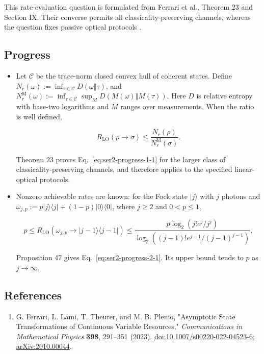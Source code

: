 This rate-evaluation question is formulated from Ferrari et al., Theorem 23 and Section IX. Their converse permits all classicality-preserving channels, whereas the question fixes passive optical protocols .

\subsection*{Progress}

\begin{itemize}
  \item Let $\mathcal C$ be the trace-norm closed convex hull of coherent states. Define $N_r(\omega):=\inf_{\tau\in\mathcal C}D(\omega\Vert\tau)$, and $N_r^{\mathrm M}(\omega):=\inf_{\tau\in\mathcal C}\sup_M D(M(\omega)\Vert M(\tau))$. Here $D$ is relative entropy with base-two logarithms and $M$ ranges over measurements. When the ratio is well defined,

\begin{equation}
R_{\mathrm{LO}}(\rho\to\sigma)\leq\frac{N_r(\rho)}{N_r^{\mathrm M}(\sigma)}.
\label{eq:ser2-progress-1-1}
\end{equation}

Theorem 23 proves Eq.~\eqref{eq:ser2-progress-1-1} for the larger class of classicality-preserving channels, and therefore applies to the specified linear-optical protocols. 

  \item Nonzero achievable rates are known: for the Fock state $|j\rangle$ with $j$ photons and $\omega_{j,p}:=p|j\rangle\langle j|+(1-p)|0\rangle\langle0|$, where $j\geq2$ and $0<p\leq1$,

\begin{equation}
p\leq R_{\mathrm{LO}}(\omega_{j,p}\to|j-1\rangle\langle j-1|)
\leq\frac{p\log_2(j!e^j/j^j)}{\log_2((j-1)!e^{j-1}/(j-1)^{j-1})},
\label{eq:ser2-progress-2-1}
\end{equation}

Proposition 47 gives Eq.~\eqref{eq:ser2-progress-2-1}. Its upper bound tends to $p$ as $j\to\infty$. 
\end{itemize}

\subsection*{References}

\begin{enumerate}[label={},leftmargin=4.8em,labelsep=0.5em]
  \footnotesize
  \item[\textup{[FLTP23]}]\label{ref:ser2-1}
  G. Ferrari, L. Lami, T. Theurer, and M. B. Plenio, "Asymptotic State Transformations of Continuous Variable Resources," \emph{Communications in Mathematical Physics} \textbf{398}, 291--351 (2023). \href{https://doi.org/10.1007/s00220-022-04523-6}{doi:10.1007/s00220-022-04523-6}; \href{https://arxiv.org/abs/2010.00044}{arXiv:2010.00044}.
\end{enumerate}

